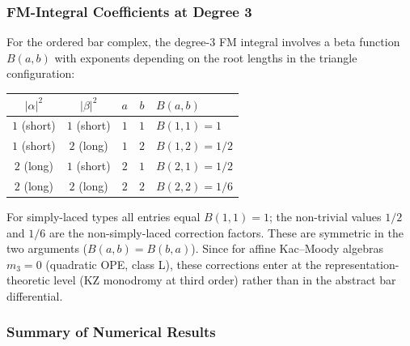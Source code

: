 \subsubsection*{FM-Integral Coefficients at Degree 3}

For the ordered bar complex, the degree-$3$ FM integral involves
a beta function $B(a,b)$ with exponents depending on the root lengths
in the triangle configuration:

\begin{center}
\begin{tabular}{ccccl}
\toprule
$|\alpha|^2$ & $|\beta|^2$ & $a$ & $b$ & $B(a,b)$ \\
\midrule
$1$ (short) & $1$ (short) & $1$ & $1$ & $B(1,1) = 1$ \\
$1$ (short) & $2$ (long) & $1$ & $2$ & $B(1,2) = 1/2$ \\
$2$ (long) & $1$ (short) & $2$ & $1$ & $B(2,1) = 1/2$ \\
$2$ (long) & $2$ (long) & $2$ & $2$ & $B(2,2) = 1/6$ \\
\bottomrule
\end{tabular}
\end{center}

\noindent For simply-laced types all entries equal $B(1,1) = 1$; the non-trivial
values $1/2$ and $1/6$ are the non-simply-laced correction factors.
These are symmetric in the two arguments ($B(a,b) = B(b,a)$).
Since for affine Kac--Moody algebras $m_3 = 0$ (quadratic OPE, class L),
these corrections enter at the representation-theoretic level (KZ monodromy
at third order) rather than in the abstract bar differential.

\subsubsection*{Summary of Numerical Results}

